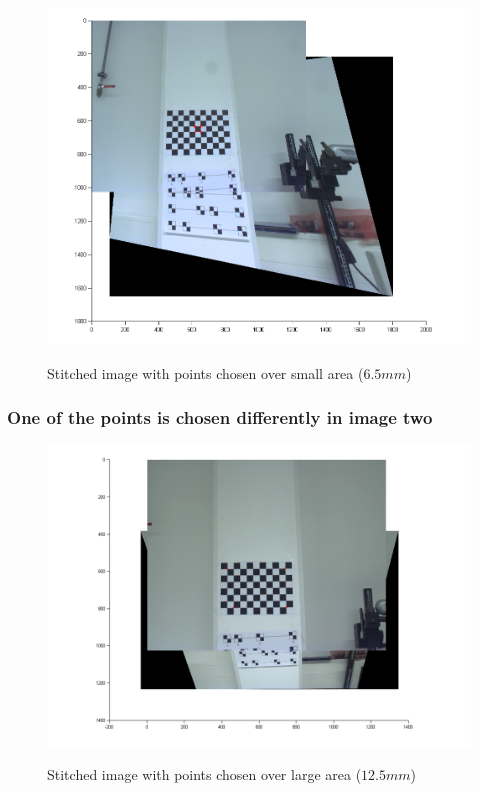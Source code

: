 \documentclass[
a4paper,     %
12pt         %
]{scrartcl}  %
\begin{document}
\begin{figure}[ht!]
 \centering
 \includegraphics[scale=0.5]{./Bildg_Messtechnik_Lab/PanoramaStitching/figb2.png}
 \label{fig:smallareastitch6.5mm}
 \caption{Stitched image with points chosen over small area ($6.5mm$)}
\end{figure}

\subsubsection{One of the points is chosen differently in image two}

\begin{figure}[ht!]
 \centering
 \includegraphics[scale=0.5]{./Bildg_Messtechnik_Lab/PanoramaStitching/fig3.png}
 \label{fig:differentareastitch12.5mm}
 \caption{Stitched image with points chosen over large area ($12.5mm$)}
\end{figure}
\end{document}
